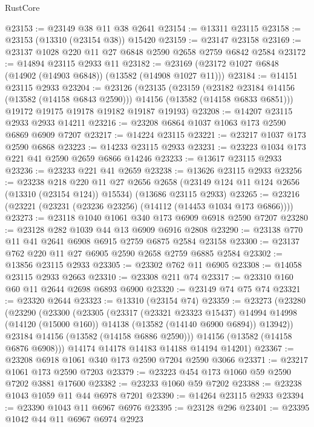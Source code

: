 \begin{lexlean}{RustCore}
\begin{coremodule}
@23153 := @23149 @38 @11 @38 @2641
@23154 := @13311 @23115
@23158 := @23153 (@13310 (@23154 @38)) @15420
@23159 := @23147 @23158
@23169 := @23137 @1028 @220 @11 @27 @6848 @2590 @2658 @2759 @6842 @2584
@23172 := @14894 @23115 @2933 @11
@23182 := @23169 (@23172 @1027 @6848 (@14902 (@14903 @6848)) (@13582 (@14908 @1027 @11)))
@23184 := @14151 @23115 @2933
@23204 := @23126
    (@23135
      (@23159
        (@23182 @23184 @14156 (@13582 (@14158 @6843 @2590)))
        @14156
        (@13582 (@14158 @6833 @6851)))
      @19172
      @19175
      @19178
      @19182
      @19187
      @19193)
@23208 := @14207 @23115 @2933 @2933 @14211
@23216 := @23208 @6864 @1037 @1063 @173 @2590 @6869 @6909 @7207
@23217 := @14224 @23115
@23221 := @23217 @1037 @173 @2590 @6868
@23223 := @14233 @23115 @2933
@23231 := @23223 @1034 @173 @221 @41 @2590 @2659 @6866 @14246
@23233 := @13617 @23115 @2933
@23236 := @23233 @221 @41 @2659
@23238 := @13626 @23115 @2933
@23256 := @23238
    @218
    @220
    @11
    @27
    @2656
    @2658
    (@23149 @124 @11 @124 @2656 (@13310 (@23154 @124)) @15534)
    (@13686 @23115 @2933)
@23265 := @23216 (@23221 (@23231 (@23236 @23256) (@14112 (@14453 @1034 @173 @6866))))
@23273 := @23118 @1040 @1061 @340 @173 @6909 @6918 @2590 @7207
@23280 := @23128 @282 @1039 @44 @13 @6909 @6916 @2808
@23290 := @23138 @770 @11 @41 @2641 @6908 @6915 @2759 @6875 @2584 @23158
@23300 := @23137 @762 @220 @11 @27 @6905 @2590 @2658 @2759 @6885 @2584
@23302 := @13856 @23115 @2933
@23305 := @23302 @762 @11 @6905
@23308 := @14058 @23115 @2933 @2663
@23310 := @23308 @211 @74
@23317 := @23310 @160 @60 @11 @2644 @2698 @6893 @6900
@23320 := @23149 @74 @75 @74
@23321 := @23320 @2644
@23323 := @13310 (@23154 @74)
@23359 := @23273
    (@23280
      (@23290
        (@23300
          (@23305
            (@23317
              (@23321 @23323 @15437)
              @14994
              @14998
              (@14120 (@15000 @160))
              @14138
              (@13582 (@14140 @6900 @6894))
              @13942))
          @23184
          @14156
          (@13582 (@14158 @6886 @2590)))
        @14156
        (@13582 (@14158 @6876 @6908)))
      @14174
      @14178
      @14183
      @14188
      @14194
      @14201)
@23367 := @23208 @6918 @1061 @340 @173 @2590 @7204 @2590 @3066
@23371 := @23217 @1061 @173 @2590 @7203
@23379 := @23223 @454 @173 @1060 @59 @2590 @7202 @3881 @17600
@23382 := @23233 @1060 @59 @7202
@23388 := @23238 @1043 @1059 @11 @44 @6978 @7201
@23390 := @14264 @23115 @2933
@23394 := @23390 @1043 @11 @6967 @6976
@23395 := @23128 @296
@23401 := @23395 @1042 @44 @11 @6967 @6974 @2923

\end{coremodule}
\end{lexlean}

